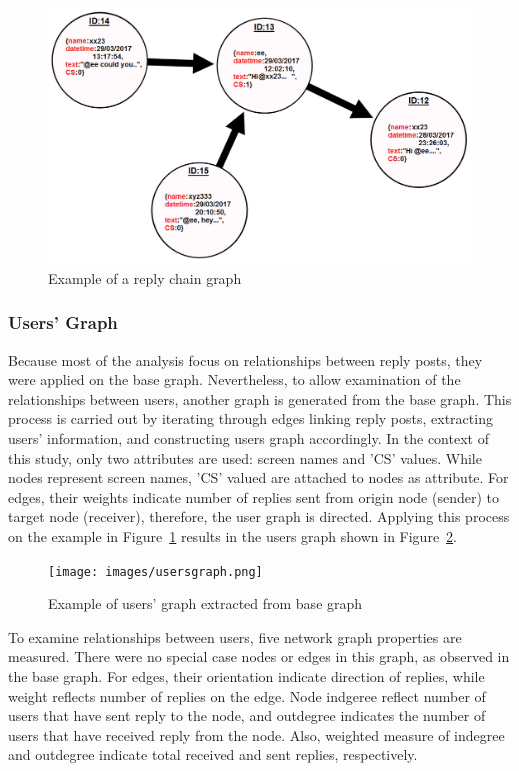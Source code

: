 \documentclass[sigconf]{acmart}
\begin{document}
{\begin{figure}[htb]
\centering
\includegraphics[width=\columnwidth]{images/replychaingraph.png}
\caption{Example of a reply chain graph}
\label{fig:replychaingraph}
\end{figure}

\subsubsection{Users' Graph}

Because most of the analysis focus on relationships between reply
posts, they were applied on the base graph. Nevertheless, to allow
examination of the relationships between users, another graph is
generated from the base graph. This process is carried out by
iterating through edges linking reply posts, extracting users'
information, and constructing users graph accordingly. In the context
of this study, only two attributes are used: screen names and
'CS' values. While nodes represent screen names, 'CS' valued
are attached to nodes as attribute. For edges, their weights indicate
number of replies sent from origin node (sender) to target node
(receiver), therefore, the user graph is directed. Applying this
process on the example in Figure~\ref{fig:replychaingraph} results in
the users graph shown in Figure~\ref{fig:usersgraph}.

\begin{figure}[htb]
\centering
\texttt{[image: images/usersgraph.png]}
\caption{Example of users' graph extracted from base graph}
\label{fig:usersgraph}
\end{figure}

To examine relationships between users, five network graph properties
are measured. There were no special case nodes or edges in this graph,
as observed in the base graph. For edges, their orientation indicate direction of 
replies, while weight reflects number of replies on the edge. 
Node indgeree reflect number of users that have sent reply to the node, 
and outdegree indicates the number of users that have received reply 
from the node. Also, weighted measure of indegree and outdegree indicate 
total received and sent replies, respectively.

}
\end{document}
